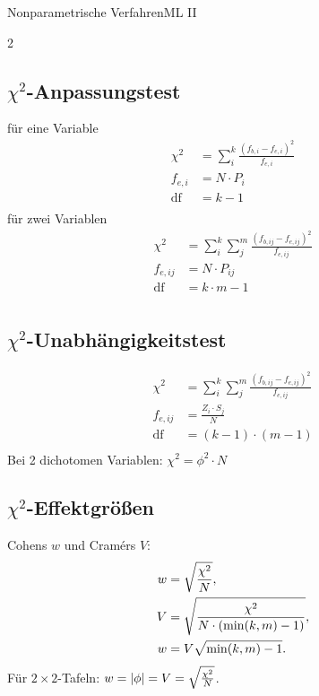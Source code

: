 
\begin{formulaBox}{Nonparametrische Verfahren}{ML II}
\label{box:nonpara}
\begin{multicols}{2}

\subsection*{$\chi^2$-Anpassungstest}
für eine Variable
\begin{align*}
\chi^2&=\sum\limits_i^k \frac{(f_{b,i}-f_{e,i})^2}{f_{e,i}}\\
f_{e,i}&=N \cdot P_i\\
\mathrm{df}&=k-1\\
\end{align*}
für zwei Variablen
\begin{align*}
\chi^2&=\sum\limits_{i}^k \sum\limits_{j}^m \frac{(f_{b,ij}-f_{e,ij})^2}{f_{e,ij}}\\
f_{e,ij}&=N \cdot P_{ij}\\
\mathrm{df}&=k \cdot m-1\\
\end{align*}

\subsection*{$\chi^2$-Unabhängigkeitstest}
\begin{align*}
\chi^2&=\sum\limits_{i}^k \sum\limits_{j}^m \frac{(f_{b,ij}-f_{e,ij})^2}{f_{e,ij}}\\
f_{e,ij}&=\frac{Z_i \cdot S_j}{N}\\
\mathrm{df}&=(k-1)\cdot(m-1)\\
\end{align*}
Bei 2 dichotomen Variablen: $\chi^2=\phi^2 \cdot N$\\

\subsection*{$\chi^2$-Effektgrößen}

Cohens $w$ und Cramérs $V$:
\begin{align*}
w&=\sqrt{\frac{\chi^2}{N}},\\
V&=\sqrt{\frac{\chi^2}{N\cdot(\min(k,m)-1)}},\\
w&=V\sqrt{\min(k,m)-1}.
\end{align*}
Für $2\times2$-Tafeln: $w=|\phi|=V=\sqrt{\frac{\chi^2}{N}}$.


\end{multicols}
\end{formulaBox}
